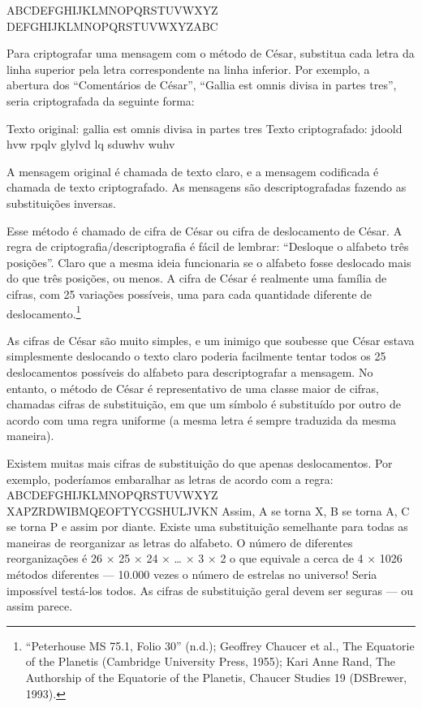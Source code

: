 \documentclass{book}
\begin{document}
%
ABCDEFGHIJKLMNOPQRSTUVWXYZ
DEFGHIJKLMNOPQRSTUVWXYZABC
%

Para criptografar uma mensagem com o método de César, substitua cada letra da linha superior pela letra correspondente na linha inferior. Por exemplo, a abertura dos ``Comentários de César'', ``Gallia est omnis divisa in partes tres'', seria criptografada da seguinte forma:

%
Texto original: gallia est omnis divisa in partes tres
Texto criptografado: jdoold hvw rpqlv glylvd lq sduwhv wuhv
%

A mensagem original é chamada de texto claro, e a mensagem codificada é chamada de texto criptografado. As mensagens são descriptografadas fazendo as substituições inversas.

Esse método é chamado de cifra de César ou cifra de deslocamento de César. A regra de criptografia/descriptografia é fácil de lembrar: ``Desloque o alfabeto três posições''. Claro que a mesma ideia funcionaria se o alfabeto fosse deslocado mais do que três posições, ou menos. A cifra de César é realmente uma família de cifras, com 25 variações possíveis, uma para cada quantidade diferente de deslocamento.\footnote{“Peterhouse MS 75.1, Folio 30” (n.d.); Geoffrey Chaucer et al., The Equatorie of the Planetis (Cambridge University Press, 1955); Kari Anne Rand, The Authorship of the Equatorie of the Planetis, Chaucer Studies 19 (DSBrewer, 1993).}

As cifras de César são muito simples, e um inimigo que soubesse que César estava simplesmente deslocando o texto claro poderia facilmente tentar todos os 25 deslocamentos possíveis do alfabeto para descriptografar a mensagem. No entanto, o método de César é representativo de uma classe maior de cifras, chamadas cifras de substituição, em que um símbolo é substituído por outro de acordo com uma regra uniforme (a mesma letra é sempre traduzida da mesma maneira).

Existem muitas mais cifras de substituição do que apenas deslocamentos. Por exemplo, poderíamos embaralhar as letras de acordo com a regra:
%
ABCDEFGHIJKLMNOPQRSTUVWXYZ
XAPZRDWIBMQEOFTYCGSHULJVKN
%
Assim, A se torna X, B se torna A, C se torna P e assim por diante. Existe uma substituição semelhante para todas as maneiras de reorganizar as letras do alfabeto. O número de diferentes reorganizações é
%
26 × 25 × 24 × … × 3 × 2
%
o que equivale a cerca de 4 × 1026 métodos diferentes --- 10.000 vezes o número de estrelas no universo! Seria impossível testá-los todos. As cifras de substituição geral devem ser seguras --- ou assim parece.
\end{document}
